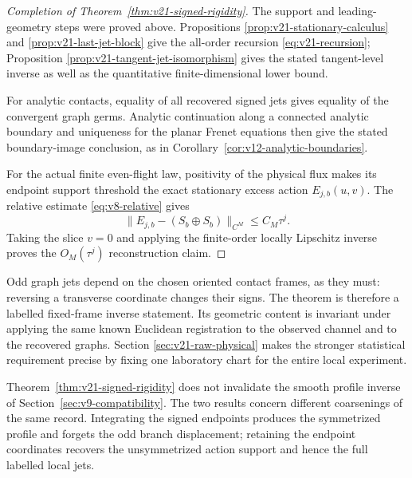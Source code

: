 \begin{proof}[Completion of Theorem~\ref{thm:v21-signed-rigidity}]
The support and leading-geometry steps were proved above.  Propositions
\ref{prop:v21-stationary-calculus} and
\ref{prop:v21-last-jet-block} give the all-order recursion
\eqref{eq:v21-recursion}; Proposition
\ref{prop:v21-tangent-jet-isomorphism} gives the stated tangent-level
inverse as well as the quantitative finite-dimensional lower bound.

For analytic contacts, equality of all recovered signed jets gives equality
of the convergent graph germs.  Analytic continuation along a connected
analytic boundary and uniqueness for the planar Frenet equations then give
the stated boundary-image conclusion, as in
Corollary~\ref{cor:v12-analytic-boundaries}.

For the actual finite even-flight law, positivity of the physical flux makes
its endpoint support threshold the exact stationary excess action
$E_{j,b}(u,v)$.  The relative estimate \eqref{eq:v8-relative} gives
\[
 \|E_{j,b}-(S_b\oplus S_b)\|_{C^M}\le C_M\tau^j.
\]
Taking the slice $v=0$ and applying the finite-order locally Lipschitz inverse
proves the $O_M(\tau^j)$ reconstruction claim.
\end{proof}

\begin{remark}
Odd graph jets depend on the chosen oriented contact frames, as they must:
reversing a transverse coordinate changes their signs.  The theorem is
therefore a labelled fixed-frame inverse statement.  Its geometric content
is invariant under applying the same known Euclidean registration to the
observed channel and to the recovered graphs.  Section
\ref{sec:v21-raw-physical} makes the stronger statistical requirement
precise by fixing one laboratory chart for the entire local experiment.
\end{remark}

\begin{remark}
Theorem~\ref{thm:v21-signed-rigidity} does not invalidate the smooth profile
inverse of Section~\ref{sec:v9-compatibility}.  The two results concern
different coarsenings of the same record.  Integrating the signed endpoints
produces the symmetrized profile and forgets the odd branch displacement;
retaining the endpoint coordinates recovers the unsymmetrized action support
and hence the full labelled local jets.
\end{remark}
